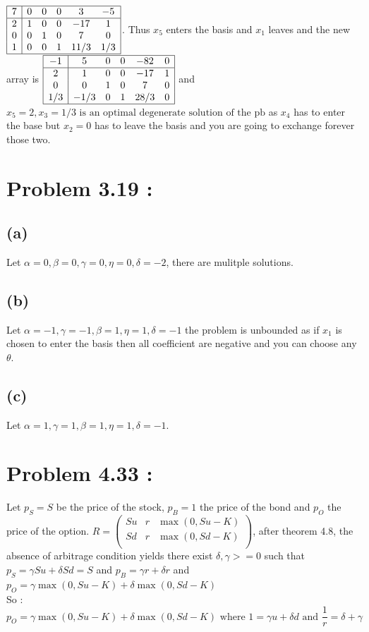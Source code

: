 \documentclass{article}
\begin{document}
$\begin{array}{|c|ccccc|}
    \hline
    7&0&0&0&3&-5\\
    \hline
    2&1&0&0&-17&1\\
    0&0&1&0&7&0\\
    1&0&0&1&11/3&1/3\\
    \hline
\end{array}$. Thus $x_5$ enters the basis and $x_1$ leaves and the new array is 
$\begin{array}{|c|ccccc|}
    \hline
    -1&5&0&0&-82&0\\
    \hline
    2&1&0&0&-17&1\\
    0&0&1&0&7&0\\
    1/3&-1/3&0&1&28/3&0\\
    \hline
\end{array}$ and $\boxed{x_5=2,x_3=1/3\text{ is an optimal degenerate solution of the pb}}$ as $x_4$ has to enter the base but $x_2 = 0$ has to leave the basis and you are going to exchange forever those two.

\section*{Problem 3.19 :}
\subsection*{(a)}
Let $\alpha = 0,\beta = 0, \gamma = 0,\eta= 0, \delta=-2$, there are mulitple solutions.
\subsection*{(b)}
Let $\alpha = -1,\gamma = -1, \beta = 1,\eta = 1,\delta = -1$ the problem is unbounded as if $x_1$ is chosen to enter the basis then all coefficient are negative and you can choose any $\theta$.
\subsection*{(c)}
Let $\alpha = 1, \gamma = 1, \beta = 1,\eta = 1,\delta = -1$.

\section*{Problem 4.33 :}
Let $p_S = S$ be the price of the stock, $p_B = 1$ the price of the bond and $p_O$ the price of the option.
$R = \left(\begin{array}{ccc}
    Su& r& \max(0,Su-K)\\
    Sd& r& \max(0,Sd-K)\\
\end{array}\right)$, after theorem 4.8, the absence of arbitrage condition yields there exist $\delta,\gamma>=0$ such that $p_S = \gamma Su + \delta Sd = S$ and $p_B = \gamma r + \delta r$ and $p_O = \gamma \max(0,Su-K)+\delta \max(0,Sd-K)$
\\
So : $$\boxed{p_O = \gamma \max(0,Su-K)+\delta \max(0,Sd-K)\text{ where }1 =\gamma u +\delta d \text{ and }\frac{1}{r} = \delta +\gamma}$$
\end{document}
